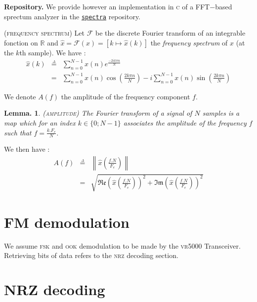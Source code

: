 \documentclass[a4paper]{report}
\newtheorem{proposition}[theorem]{Lemma.}
\newenvironment{definition}[1][Definition.]{\begin{trivlist}
\item[\hskip \labelsep {\bfseries #1}]}{\end{trivlist}}
\begin{document}
\textbf{Repository.} We provide however an implementation in \textsc{c} of a FFT$-$based sprectum analyzer in the \href{https://github.com/EmptyStackExn/spectra}{\texttt{spectra}} repository.

\begin{definition}
\textsc{(frequency spectrum)}
Let $\mathcal{F}$ be the discrete Fourier transform of an integrable fonction on $\mathbb{R}$ and $\hat{x} = \mathcal{F}(x) = \left [ k \mapsto \hat{x}(k)\right ]$ the \textit{frequency spectrum} of $x$ (at the $k$th sample). We have\cite{Senlis} :
\begin{eqnarray*}
\hat{x}(k) &\overset{\underset{\Delta}{}}{=}& \sum^{N - 1}_{n = 0}{x(n)e^{\frac{-2ik \pi n}{N}}}\\
           &=& \sum^{N - 1}_{n = 0}{x(n)\cos \left ( \frac{2k \pi n}{N} \right )} - i\sum^{N - 1}_{n = 0}{x(n)\sin \left ( \frac{2k \pi n}{N} \right )}
\end{eqnarray*}
\end{definition}

We denote $A (f)$ the amplitude of the frequency component $f$.

\begin{proposition}
\textsc{(amplitude)}
The Fourier transform of a signal of $N$ samples is a map which for an index $k \in \{0 ; N - 1\}$ associates the amplitude of the frequency $f$ such that $f = \frac{k.F_e}{N}$.
\end{proposition}

We then have\cite{Senlis} :
\begin{eqnarray*}
  A (f) &\overset{\underset{\Delta}{}}{=}& \left \| \hat{x} \left (\frac{f.N}{F_e} \right ) \right \|\\
        &=& \sqrt{\mathfrak{Re} \left ( \hat{x} \left (\frac{f.N}{F_e} \right ) \right )^2 + \mathfrak{Im} \left ( \hat{x} \left (\frac{f.N}{F_e} \right ) \right )^2}
\end{eqnarray*}

\section{FM demodulation}

We assume \textsc{fsk} and \textsc{ook} demodulation to be made by the \textsc{vr5000} Transceiver. Retrieving bits of data refers to the \textsc{nrz} decoding section.

\section{NRZ decoding}
\end{document}
